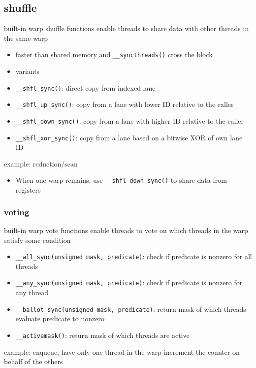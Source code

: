 \documentclass{article}
\begin{document}
\subsection{shuffle}

built-in warp shuffle functions enable threads to share data with other threads in the same warp

\begin{itemize}
\item faster than shared memory and \texttt{\_\_syncthreads()} cross the block
\item variants
\item \texttt{\_\_shfl\_sync()}: direct copy from indexed lane
\item \texttt{\_\_shfl\_up\_sync()}: copy from a lane with lower ID relative to the caller
\item \texttt{\_\_shfl\_down\_sync()}: copy from a lane with higher ID relative to the caller
\item \texttt{\_\_shfl\_xor\_sync()}: copy from a lane based on a bitwise XOR of own lane ID

\end{itemize}
example: reduction/scan

\begin{itemize}
\item When one warp remains, use \texttt{\_\_shfl\_down\_sync()} to share data from registers

\end{itemize}
\subsubsection{voting}

built-in warp vote functions enable threads to vote on which threads in the warp satisfy some condition

\begin{itemize}
\item \texttt{\_\_all\_sync(unsigned mask, predicate)}: check if predicate is nonzero for all threads
\item \texttt{\_\_any\_sync(unsigned mask, predicate)}: check if predicate is nonzero for any thread
\item \texttt{\_\_ballot\_sync(unsigned mask, predicate)}: return mask of which threads evaluate predicate to nonzero
\item \texttt{\_\_activemask()}: return mask of which threads are active

\end{itemize}
example: enqueue, have only one thread in the warp increment the counter on behalf of the others
\end{document}
